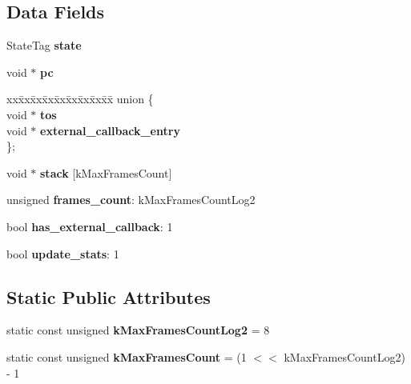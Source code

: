 \subsection*{Data Fields}
\begin{DoxyCompactItemize}
\item 
\mbox{\label{structv8_1_1TickSample_a6ca7bd9445806b92b938eab2e700c324}} 
State\+Tag {\bfseries state}
\item 
\mbox{\label{structv8_1_1TickSample_a33cfc3082f836ce04dfcb97a3691f599}} 
void $\ast$ {\bfseries pc}
\item 
\mbox{\label{structv8_1_1TickSample_af5ce7424155dd71dd815c80f1b0f93f6}} 
\begin{tabbing}
xx\=xx\=xx\=xx\=xx\=xx\=xx\=xx\=xx\=\kill
union \{\\
\>void $\ast$ {\bfseries tos}\\
\>void $\ast$ {\bfseries external\_callback\_entry}\\
\}; \\

\end{tabbing}\item 
\mbox{\label{structv8_1_1TickSample_ae85c9bd6ff1da565d7e3066615a4d450}} 
void $\ast$ {\bfseries stack} \mbox{[}k\+Max\+Frames\+Count\mbox{]}
\item 
\mbox{\label{structv8_1_1TickSample_a00bfe6e03f75c291e220777fe74272d5}} 
unsigned {\bfseries frames\+\_\+count}\+: k\+Max\+Frames\+Count\+Log2
\item 
\mbox{\label{structv8_1_1TickSample_aa7c90f53d4ac6ab23727e21369f70b6e}} 
bool {\bfseries has\+\_\+external\+\_\+callback}\+: 1
\item 
\mbox{\label{structv8_1_1TickSample_aece17f054264917dcf20fd9ef0616930}} 
bool {\bfseries update\+\_\+stats}\+: 1
\end{DoxyCompactItemize}
\subsection*{Static Public Attributes}
\begin{DoxyCompactItemize}
\item 
\mbox{\label{structv8_1_1TickSample_a74b64cf598134b781b4ae1c65c31a70a}} 
static const unsigned {\bfseries k\+Max\+Frames\+Count\+Log2} = 8
\item 
\mbox{\label{structv8_1_1TickSample_a7f1b6ed32cd88d137e70d99adaa37d64}} 
static const unsigned {\bfseries k\+Max\+Frames\+Count} = (1 $<$$<$ k\+Max\+Frames\+Count\+Log2) -\/ 1
\end{DoxyCompactItemize}


